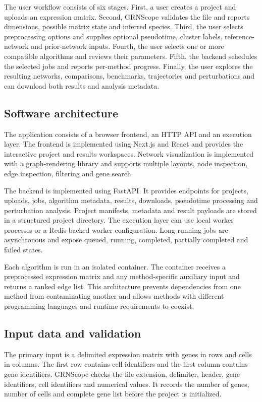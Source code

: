 \documentclass[unnumsec,webpdf,modern,large]{oup-authoring-template}%
\begin{document}
The user workflow consists of six stages. First, a user creates a project and uploads an expression matrix. Second, GRNScope validates the file and reports dimensions, possible matrix state and inferred species. Third, the user selects preprocessing options and supplies optional pseudotime, cluster labels, reference-network and prior-network inputs. Fourth, the user selects one or more compatible algorithms and reviews their parameters. Fifth, the backend schedules the selected jobs and reports per-method progress. Finally, the user explores the resulting networks, comparisons, benchmarks, trajectories and perturbations and can download both results and analysis metadata.

\subsection{Software architecture}

The application consists of a browser frontend, an HTTP API and an execution layer. The frontend is implemented using Next.js and React and provides the interactive project and results workspaces. Network visualization is implemented with a graph-rendering library and supports multiple layouts, node inspection, edge inspection, filtering and gene search.

The backend is implemented using FastAPI. It provides endpoints for projects, uploads, jobs, algorithm metadata, results, downloads, pseudotime processing and perturbation analysis. Project manifests, metadata and result payloads are stored in a structured project directory. The execution layer can use local worker processes or a Redis-backed worker configuration. Long-running jobs are asynchronous and expose queued, running, completed, partially completed and failed states.

Each algorithm is run in an isolated container. The container receives a preprocessed expression matrix and any method-specific auxiliary input and returns a ranked edge list. This architecture prevents dependencies from one method from contaminating another and allows methods with different programming languages and runtime requirements to coexist.

\subsection{Input data and validation}

The primary input is a delimited expression matrix with genes in rows and cells in columns. The first row contains cell identifiers and the first column contains gene identifiers. GRNScope checks the file extension, delimiter, header, gene identifiers, cell identifiers and numerical values. It records the number of genes, number of cells and complete gene list before the project is initialized.
\end{document}
